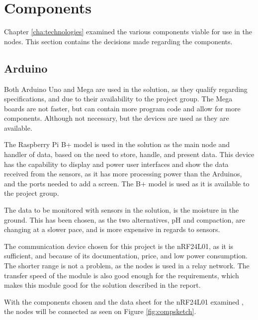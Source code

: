 \section{Components}
Chapter \ref{cha:technologies} examined the various components viable for use in the nodes. This section contains the decisions made regarding the components.

\subsection{Arduino}
Both Arduino Uno and Mega are used in the solution, as they qualify regarding specifications, and due to their availability to the project group. The Mega boards are not faster, but can contain more program code and allow for more components. Although not necessary, but the devices are used as they are available.

The Raspberry Pi B+ model is used in the solution as the main node and handler of data, based on the need to store, handle, and present data.  This device has the capability to display and power user interfaces and show the data received from the sensors, as it has more processing power than the Arduinos, and the ports needed to add a screen. The B+ model is used as it is available to the project group.

The data to be monitored with sensors in the solution, is the moisture in the ground. This has been chosen, as the two alternatives, pH and compaction, are changing at a slower pace, and is more expensive in regards to sensors.

The communication device chosen for this project is the nRF24L01, as it is sufficient, and because of its documentation, price, and low power consumption. The shorter range is not a problem, as the nodes is used in a relay network. The transfer speed of the module is also good enough for the requirements, which makes this module good for the solution described in the report.

With the components chosen and the data sheet for the nRF24L01 examined \cite{nf24datasheet}, the nodes will be connected as seen on Figure \ref{fig:compsketch}.

